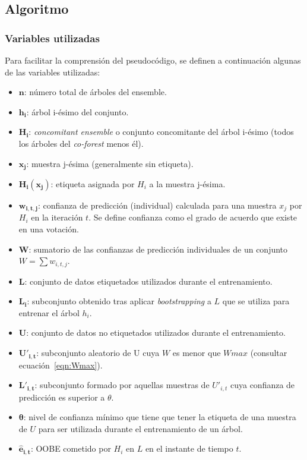 \subsection{Algoritmo}


\subsubsection{Variables utilizadas}

Para facilitar la comprensión del pseudocódigo, se definen a continuación algunas de las variables utilizadas:
\begin{itemize}
	\item $\mathbf{n}$: número total de árboles del ensemble.
	\item $\mathbf{h_{i}}$: árbol i-ésimo del conjunto.
	\item $\mathbf{H_{i}}$: \textit{concomitant ensemble} o conjunto concomitante del árbol i-ésimo (todos los árboles del \textit{co-forest} menos él).
	\item $\mathbf{x_j}$: muestra j-ésima (generalmente sin etiqueta).
	\item $\mathbf{H_i(x_j)}$: etiqueta asignada por $H_i$ a la muestra j-ésima.
	\item $\mathbf{w_{i,t,j}}$: confianza de predicción (individual) calculada para una muestra $x_j$ por $H_{i}$ en la iteración $t$. Se define confianza como el grado de acuerdo que existe en una votación. 
	\item $\mathbf{W}$: sumatorio de las confianzas de predicción individuales de un conjunto $W = \sum w_{i,t,j}$.
	\item $\mathbf{L}$: conjunto de datos etiquetados utilizados durante el entrenamiento.
	\item $\mathbf{L_{i}}$: subconjunto obtenido tras aplicar \textit{bootstrapping} a $L$ que se utiliza para entrenar el árbol $h_{i}$.
	\item $\mathbf{U}$: conjunto de datos no etiquetados utilizados durante el entrenamiento.
	\item $\mathbf{U'_{i,t}}$: subconjunto aleatorio de U cuya $W$ es menor que $Wmax$ (consultar ecuación~\ref{eqn:Wmax}).
	\item $\mathbf{L'_{i,t}}$: subconjunto formado por aquellas muestras de $U'_{i,t}$ cuya confianza de predicción es superior a $\theta$.
	\item $\mathbf{\theta}$: nivel de confianza mínimo que tiene que tener la etiqueta de una muestra de $U$ para ser utilizada durante el entrenamiento de un árbol.
	\item $\mathbf{\hat{e}_{i,t}}$: OOBE cometido por $H_{i}$ en $L$ en el instante de tiempo $t$.


\end{itemize}
